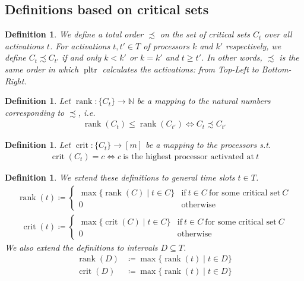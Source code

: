 \documentclass[a4paper]{article}
\DeclareMathOperator{\PLTR}{pltr}
\DeclareMathOperator{\rank}{rank}
\DeclareMathOperator{\crit}{crit}
\newtheorem{definition}[theorem]{Definition}
\begin{document}
\subsection{Definitions based on critical sets}
\begin{definition}
  We define a total order $\precsim$ on the set of critical sets $C_t$ over all activations $t$.
  For activations $t, t' \in T$ of processors $k$ and $k'$ respectively, we define $C_t \precsim C_{t'}$ if and only $k < k'$ or $k = k'$ and $t \geq t'$.
  In other words, $\precsim$ is the same order in which $\PLTR$ calculates the activations: from Top-Left to Bottom-Right.
\end{definition}
\begin{definition}
  Let $\rank: \{C_t\} \rightarrow \mathbb{N}$ be a mapping to the natural numbers corresponding to $\precsim$, i.e.
  \begin{align}
    \rank(C_t) \leq \rank(C_{t'})
    \Leftrightarrow
    C_t \precsim C_{t'}
  \end{align}
\end{definition}
\begin{definition}
  Let $\crit: \{C_t\} \rightarrow [m]$ be a mapping to the processors s.t.
  \begin{align}
    \crit(C_t) = c
    \Leftrightarrow
    c~\text{is the highest processor activated at}~t
  \end{align}
\end{definition}
\begin{definition}
  We extend these definitions to general time slots $t \in T$.
  \begin{align}
    \rank(t) \coloneqq
    \begin{cases}
      \max \{\rank(C) \mid t \in C \}
      & \text{if}~t \in C~\text{for some critical set}~C
      \\0
      & \text{otherwise}
    \end{cases}
  \end{align}
  \begin{align}
    \crit(t) \coloneqq
    \begin{cases}
      \max \{\crit(C) \mid t \in C \}
      & \text{if}~t \in C~\text{for some critical set}~C
      \\0
      & \text{otherwise}
    \end{cases}
  \end{align}
  We also extend the definitions to intervals $D \subseteq T$.
  \begin{align}
    \rank(D) &\coloneqq \max \{ \rank(t) \mid t \in D \}
    \\ \crit(D) &\coloneqq \max \{ \rank(t) \mid t \in D \}
  \end{align}
\end{definition}
\end{document}
